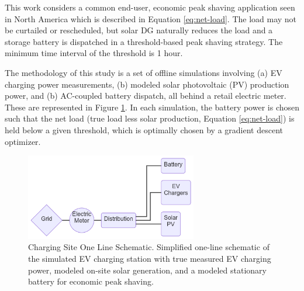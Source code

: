 \documentclass[journal,article,submit,pdftex,moreauthors]{Definitions/mdpi}
\begin{document}
This work considers a common end-user, economic peak shaving application seen in North America which is described in Equation \ref{eq:net-load}. The load may not be curtailed or rescheduled, but solar DG naturally reduces the load and a storage battery is dispatched in a threshold-based peak shaving strategy. The minimum time interval of the threshold is 1 hour.

The methodology of this study is a set of offline simulations involving (a) EV charging power measurements, (b) modeled solar photovoltaic (PV) production power, and (b) AC-coupled battery dispatch, all behind a retail electric meter. These are represented in Figure \ref{fig:oneline}. In each simulation, the battery power is chosen such that the net load (true load less solar production, Equation \ref{eq:net-load}) is held below a given threshold, which is optimally chosen by a gradient descent optimizer.

\begin{figure}
  \centering
  \includegraphics[width=7.5cm]{./images/oneline.png}
  \caption{Charging Site One Line Schematic. Simplified one-line schematic of the simulated EV charging station with true measured EV charging power, modeled on-site solar generation, and a modeled stationary battery for economic peak shaving.}
  \label{fig:oneline}
\end{figure}
\end{document}
